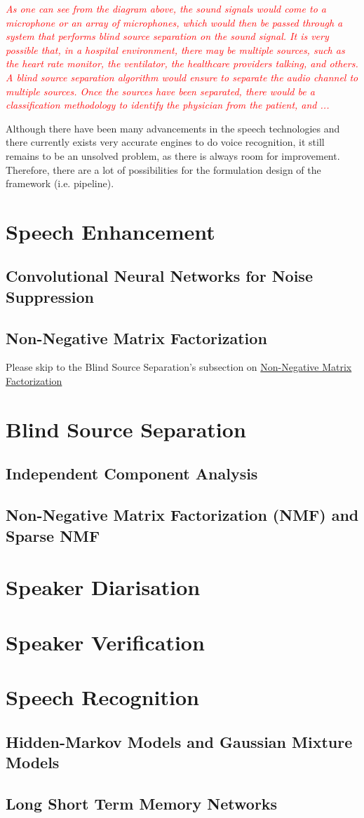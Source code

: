 \textcolor{red}{\textit{As one can see from the diagram above, the sound signals would come to a microphone or an array of microphones, which would then be passed through a system that performs blind source separation on the sound signal. It is very possible that, in a hospital environment, there may be multiple sources, such as the heart rate monitor, the ventilator, the healthcare providers talking, and others. A blind source separation algorithm would ensure to separate the audio channel to multiple sources. Once the sources have been separated, there would be a classification methodology to identify the physician from the patient, and ...}}

Although there have been many advancements in the speech technologies and there currently exists very accurate engines to do voice recognition, it still remains to be an unsolved problem, as there is always room for improvement. Therefore, there are a lot of possibilities for the formulation design of the framework (i.e. pipeline).

\section{Speech Enhancement}
\subsection{Convolutional Neural Networks for Noise Suppression}
\subsection{Non-Negative Matrix Factorization}
Please skip to the Blind Source Separation's subsection on \hyperref[sec:NMF]{Non-Negative Matrix Factorization}
\section{Blind Source Separation}
\subsection{Independent Component Analysis}
\subsection{Non-Negative Matrix Factorization (NMF) and Sparse NMF} \label{sec:NMF}

\section{Speaker Diarisation}
\section{Speaker Verification}
\section{Speech Recognition}
\subsection{Hidden-Markov Models and Gaussian Mixture Models}
\subsection{Long Short Term Memory Networks}
